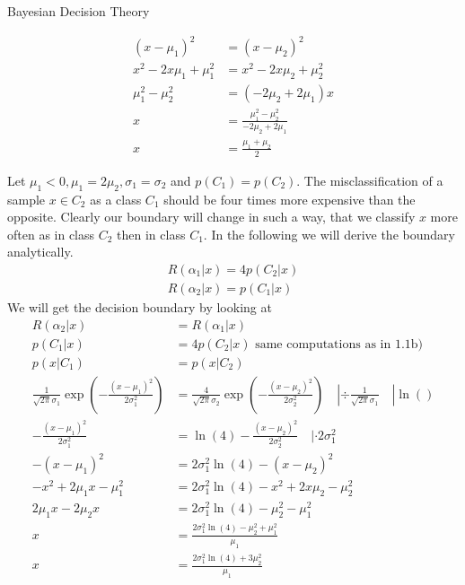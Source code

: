 \documentclass[
ngerman,
]{tudaexercise}
\begin{document}
\begin{task}{Bayesian Decision Theory}
\begin{subtask}
\begin{align*}
			(x- \mu_1)^2 &= (x - \mu_2)^2 \\
			x^2 - 2x\mu_1 + \mu_1^2 &= x^2 - 2x\mu_2 + \mu_2^2 \\
			\mu_1^2 - \mu_2^2 &= (-2 \mu_2 + 2 \mu_1)x \\
			x &= \frac{\mu_1^2 - \mu_2^2}{-2 \mu_2 + 2 \mu_1}\\
			x &= \frac{\mu_1 + \mu_2}{2}
			\end{align*}
		\end{subtask}
		\begin{subtask}
			Let $\mu_1 < 0, \mu_1 = 2\mu_2, \sigma_1 = \sigma_2$ and $p(C_1) = p(C_2)$. The misclassification of a sample $x \in C_2$ as a class $C_1$ should be four times more expensive than the opposite. Clearly our boundary will change in such a way, that we classify $x$ more often as in class $C_2$ then in class $C_1$. In the following we will derive the boundary analytically.
			\begin{align*}
			R(\alpha_1 | x) = 4 p(C_2 | x)\\
			R(\alpha_2 | x) = p(C_1 | x)
			\end{align*}
			We will get the decision boundary by looking at
			\begin{align*}
			R(\alpha_2 | x) &= R( \alpha_1 | x) \\
			p(C_1 | x) &= 4p(C_2 | x) \text{ same computations as in 1.1b) } \\
			p(x | C_1) &= p(x | C_2) \\
			\frac{1}{\sqrt{2 \pi} \sigma_1} \exp \left( -\frac{(x- \mu_1)^2}{2 \sigma_1^2} \right) &= \frac{4}{\sqrt{2 \pi} \sigma_2} \exp \left( -\frac{(x- \mu_2)^2}{2 \sigma_2^2} \right) \quad | \div \frac{1}{\sqrt{2 \pi} \sigma_1} \quad | \ln() \\
			-\frac{(x- \mu_1)^2}{2 \sigma_1^2} &= \ln(4) -\frac{(x- \mu_2)^2}{2 \sigma_2^2} \quad | \cdot 2 \sigma_1^2 \\
			-(x - \mu_1)^2 &= 2 \sigma_1^2 \ln(4) - (x - \mu_2)^2 \\
			-x^2 + 2 \mu_1 x - \mu_1^2 &= 2 \sigma_1^2 \ln(4) - x^2 + 2x \mu_2 - \mu_2^2 \\
			2 \mu_1x - 2\mu_2x &= 2 \sigma_1^2 \ln(4) - \mu_2^2 - \mu_1^2 \\
			x &= \frac{2 \sigma_1^2 \ln(4) - \mu_2^2 + \mu_1^2}{\mu_1} \\
			x &= \frac{2 \sigma_1^2 \ln(4) + 3\mu_2^2}{\mu_1}
			\end{align*}
		\end{subtask}
	\end{task}
	
\end{document}
